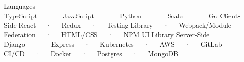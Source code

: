 

\begin{cvtechnicals}
  \cvtechnical %
  {Languages} %
  {TypeScript~~~·~~~JavaScript~~~·~~~Python~~~·~~~Scala~~~·~~~Go} %
  {Client-Side} %
  {React~~~·~~~Redux~~~·~~~Testing Library~~~·~~~Webpack/Module Federation~~~·~~~HTML/CSS~~~·~~~NPM UI Library} %
  {Server-Side} %
  {Django~~~·~~~Express~~~·~~~Kubernetes~~~·~~~AWS~~~·~~~GitLab CI/CD~~~·~~~Docker~~~·~~~Postgres~~~·~~~MongoDB} %
\end{cvtechnicals}